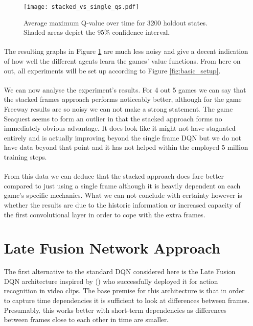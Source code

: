 \begin{figure}[htpb]
  \centering
  \texttt{[image: stacked\_vs\_single\_qs.pdf]}
  \caption{
    Average maximum Q-value over time for 3200 holdout states.
    Shaded areas depict the $95\%$ confidence interval.
  }
  \label{fig:stacked_vs_single_qs}
\end{figure}

\paragraph{}
The resulting graphs in Figure \ref{fig:stacked_vs_single_qs}
are much less noisy
and give a decent indication of how well the
different agents learn the games' value functions.
From here on out,
all experiments will be set up according to
Figure \ref{fig:basic_setup}.

\paragraph{}
We can now analyse the experiment's results.
For 4 out 5 games we can say that the stacked frames approach
performs noticeably better,
although for the game Freeway results are so noisy
we can not make a strong statement.
The game Seaquest seems to form an outlier
in that the stacked approach forms no immediately obvious advantage.
It does look like it might not have stagnated entirely
and is actually improving beyond the single frame DQN
but we do not have data beyond that point
and it has not helped within the employed 5 million training steps.

\paragraph{}
From this data we can deduce that the stacked approach does
fare better compared to just using a single frame
although it is heavily dependent on each game's specific mechanics.
What we can not conclude with certainty however
is whether the results are due to the historic information
or increased capacity of the first convolutional layer
in order to cope with the extra frames.


\section{Late Fusion Network Approach}
\label{sec:late_fusion_network_approach}
The first alternative to the standard DQN
considered here is
the Late Fusion DQN architecture
inspired by \citeauthor{Karpathy2014} (\citeyear{Karpathy2014})
who successfully deployed it for
action recognition in video clips.
The base premise for this architecture
is that in order to capture time dependencies
it is sufficient to look at differences
between frames.
Presumably,
this works better with short-term dependencies
as differences between frames close to each other in time
are smaller.


